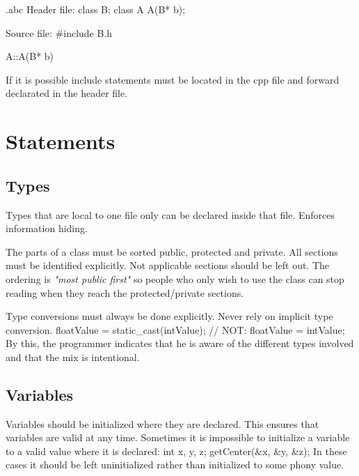 \begin{filecontents*}{\jobname.abc}
	Header file:
	class B;
	class A 
	{
	    A(B* b);
	} 
	
	Source file:
	#include B.h
	
	A::A(B* b) {}
\end{filecontents*}

\recommendation
{If it is possible include statements must be located in the cpp file and forward declarated in the header file.}
{}
{}


\section{Statements}
\subsection{Types}

\recommendation
{Types that are local to one file only can be declared inside that file.}
{}
{Enforces information hiding.}

\recommendation
{The parts of a class must be sorted public, protected and private. All sections must be identified explicitly. Not applicable sections should be left out.}
{}
{The ordering is \textit{"most public first"} so people who only wish to use the class can stop reading when they reach the protected/private sections.}

\recommendation
{Type conversions must always be done explicitly. Never rely on implicit type conversion.}
{floatValue = static\_cast(intValue); // NOT: floatValue = intValue;}
{By this, the programmer indicates that he is aware of the different types involved and that the mix is intentional.}

\subsection{Variables}

\recommendation
{Variables should be initialized where they are declared.}
{}
{
	This ensures that variables are valid at any time. Sometimes it is impossible to initialize a variable to a valid value where it is declared:\newline
	int x, y, z;\newline
	getCenter(\&x, \&y, \&z);\newline
	In these cases it should be left uninitialized rather than initialized to some phony value.
}

